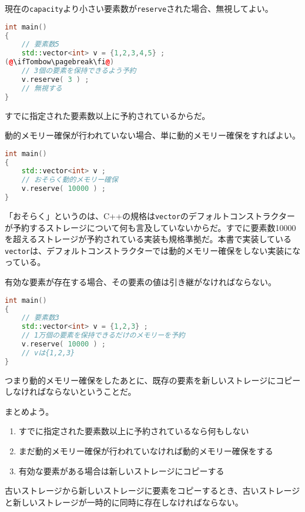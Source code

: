 現在の\texttt{capacity}より小さい要素数が\texttt{reserve}された場合、無視してよい。

\begin{lstlisting}[language={C++}]
int main()
{
    // 要素数5
    std::vector<int> v = {1,2,3,4,5} ;
(@\ifTombow\pagebreak\fi@)
    // 3個の要素を保持できるよう予約
    v.reserve( 3 ) ;
    // 無視する
}
\end{lstlisting}

すでに指定された要素数以上に予約されているからだ。

動的メモリー確保が行われていない場合、単に動的メモリー確保をすればよい。

\begin{lstlisting}[language={C++}]
int main()
{
    std::vector<int> v ;
    // おそらく動的メモリー確保
    v.reserve( 10000 ) ;
}
\end{lstlisting}

「おそらく」というのは、C++の規格は\texttt{vector}のデフォルトコンストラクターが予約するストレージについて何も言及していないからだ。すでに要素数10000を超えるストレージが予約されている実装も規格準拠だ。本書で実装している\texttt{vector}は、デフォルトコンストラクターでは動的メモリー確保をしない実装になっている。

有効な要素が存在する場合、その要素の値は引き継がなければならない。

\begin{lstlisting}[language={C++}]
int main()
{
    // 要素数3
    std::vector<int> v = {1,2,3} ;
    // 1万個の要素を保持できるだけのメモリーを予約
    v.reserve( 10000 ) ;
    // vは{1,2,3}
}
\end{lstlisting}

つまり動的メモリー確保をしたあとに、既存の要素を新しいストレージにコピーしなければならないということだ。

まとめよう。

\begin{enumerate}
\def\labelenumi{\arabic{enumi}.}
\item
  すでに指定された要素数以上に予約されているなら何もしない
\item
  まだ動的メモリー確保が行われていなければ動的メモリー確保をする
\item
  有効な要素がある場合は新しいストレージにコピーする
\end{enumerate}

古いストレージから新しいストレージに要素をコピーするとき、古いストレージと新しいストレージが一時的に同時に存在しなければならない。

